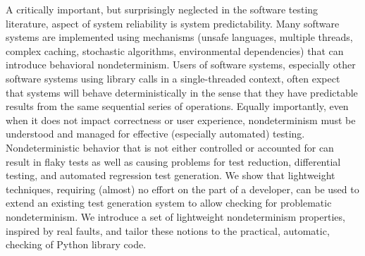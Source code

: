 A critically important, but surprisingly neglected in the software testing literature, aspect of system reliability is system predictability.  Many software systems are implemented using mechanisms (unsafe languages, multiple threads, complex caching, stochastic algorithms, environmental dependencies) that can introduce behavioral nondeterminism.  Users of software systems, especially other software systems using library calls in a single-threaded context, often expect that systems will behave deterministically in the sense that they have predictable results from the same sequential series of operations.  Equally importantly, even when it does not impact correctness or user experience, nondeterminism must be understood and managed for effective (especially automated) testing.  Nondeterministic behavior that is not either controlled or accounted for can result in flaky tests as well as causing problems for test reduction, differential testing, and automated regression test generation.  We show that lightweight techniques, requiring (almost) no effort on the part of a developer, can be used to extend an existing test generation system to allow checking for problematic nondeterminism.  We introduce a set of lightweight nondeterminism properties, inspired by real faults, and tailor these notions to the practical, automatic, checking of Python library code.